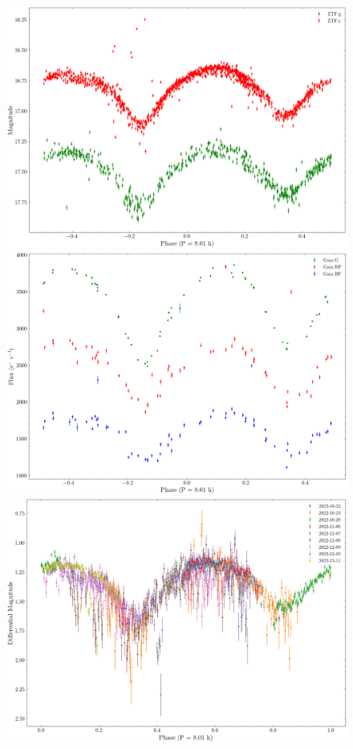 \begin{figure}[!h]
	\centering
	\includegraphics[scale=0.29]{Metodologia/Secciones/AnalisisPeriodo/Figures/ZTF Phase-Folded.png}
	\includegraphics[scale=0.29]{Metodologia/Secciones/AnalisisPeriodo/Figures/Gaia Phase-Folded.png}
	\includegraphics[scale=0.3]{Metodologia/Secciones/AnalisisPeriodo/Figures/Iturbide Phase-Folded.png}


\end{figure}
